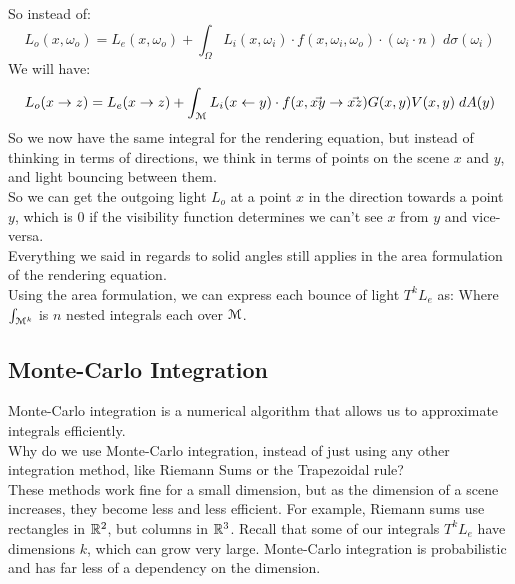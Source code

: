 \documentclass[12pt]{article}
\begin{document}
So instead of:
\[  L_{o}(x, \omega_o)= L_{e}(x, \omega_o) +
\int_\Omega L_{i}(x, \omega_i) \cdot
f(x, \omega_i, \omega_o) \cdot
(\omega_i \cdot n) \; d\sigma(\omega_i) \]
We will have:
\[  L_{o}(x \to z)= L_{e}(x \to z) +
\int_{\mathcal{M}} L_{i}(x \leftarrow y) \cdot
f(x, \vec{xy} \to \vec{xz}) G(x, y) V(x, y) \; dA(y) \]
So we now have the same integral
for the rendering equation, but instead
of thinking in terms of directions, we think
in terms of points on the scene $x$ and $y$,
and light bouncing between them. \\
So we can get the outgoing light $L_o$
at a point $x$ in the direction towards a point $y$,
which is $0$ if the visibility function
determines we can't see $x$ from $y$ and vice-versa. \\

Everything we said in regards to solid angles still
applies in the area formulation of the rendering
equation. \\

Using the area formulation, we can express
each bounce of light $T^kL_e$ as:
Where $\int_{\mathcal{M}^k}$ is $n$ nested integrals
each over $\mathcal{M}$. \\

\newpage

\subsection*{Monte-Carlo Integration}

Monte-Carlo integration is a numerical
algorithm that allows us to approximate
integrals efficiently. \\

Why do we use Monte-Carlo
integration, instead of just using any
other integration method, like Riemann
Sums or the Trapezoidal rule? \\
These methods work fine for a small
dimension, but as the dimension of a scene
increases, they become less and less efficient. 
For example, Riemann sums use rectangles in
$\mathbb{R}^2$, but columns in $\mathbb{R}^3$.
Recall that some of our integrals
$T^kL_e$ have dimensions $k$,
which can grow very large.
Monte-Carlo integration is probabilistic
and has far less of a dependency
on the dimension. \\
\end{document}

